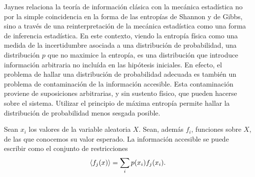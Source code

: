 Jaynes relaciona la teoría de información clásica con la mecánica estadística no por la simple coincidencia en la forma de las entropías de Shannon y de Gibbs, sino a través de una reinterpretación de la mecánica estadística como una forma de inferencia estadística. En este contexto, viendo la entropía física como una medida de la incertidumbre asociada a una distribución de probabilidad, una distribución $p$ que no maximice la entropía, es una distribución que introduce información arbitraria no incluída en las hipótesis iniciales. En efecto, el problema de hallar una distribución de probabilidad adecuada es también un problema de contaminación de la información accesible. Esta contaminación proviene de suposiciones arbitrarias, y sin sustento físico, que pueden hacerse sobre el sistema. Utilizar el principio de máxima entropía permite hallar la distribución de probabilidad menos sesgada posible. 


Sean $x_{i}$ los valores de la variable aleatoria $X$.  Sean, además $f_{i}$, funciones sobre $X$, de las que conocemos su valor esperado. La información accesible se puede escribir como el conjunto de restricciones
\begin{equation}\label{eq:JaynesRestrictions}
    \expval{f_{j}(x)}=\sum_{i}p(x_{i})f_{j}(x_{i}).
\end{equation}


